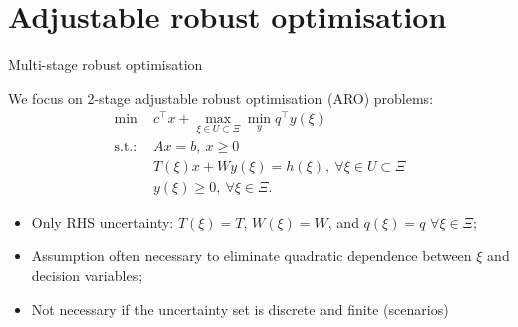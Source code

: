 \section{Adjustable robust optimisation}


\begin{frame}{Multi-stage robust optimisation}

	We focus on 2-stage adjustable robust optimisation (ARO) problems:
	\begin{equation} \tag{ARO}
	\begin{aligned}
		\min~  & c^\top x + \max_{\xi \in U \subset \Xi} \min_y q^\top y(\xi) \\
		\text{s.t.:~}  & Ax = b, \ x \ge 0 \\
			   & T(\xi)x + Wy(\xi) = h(\xi), \ \forall \xi \in U \subset \Xi \\
			   & y(\xi) \ge 0, \ \forall \xi \in \Xi.
	\end{aligned}
	\end{equation}
	\pause
	\vspace{-6pt}
	\begin{itemize}
		\item Only \alert{RHS} uncertainty: $T(\xi) = T$, $W(\xi) = W$, and $q(\xi) = q$ $\forall \xi \in \Xi$;
		\item Assumption often necessary to eliminate \alert{quadratic} dependence between $\xi$ and decision variables;
		\item Not necessary if the uncertainty set is \alert{discrete} and \alert{finite} (scenarios)
	\end{itemize}



	
\end{frame}



